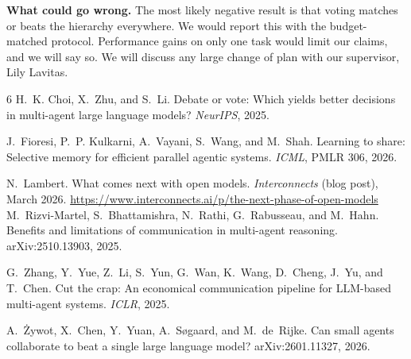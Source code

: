 \documentclass{article}
\begin{document}
\textbf{What could go wrong.} The most likely negative result is that voting matches or beats the hierarchy everywhere. We would report this with the budget-matched protocol. Performance gains on only one task would limit our claims, and we will say so. We will discuss any large change of plan with our supervisor, Lily Lavitas.
\newpage
\small
\begin{thebibliography}{6}\setlength{\itemsep}{0pt}\setlength{\parskip}{0pt}
H.~K. Choi, X.~Zhu, and S.~Li.
Debate or vote: Which yields better decisions in multi-agent large language models?
\emph{NeurIPS}, 2025.

J.~Fioresi, P.~P. Kulkarni, A.~Vayani, S.~Wang, and M.~Shah.
Learning to share: Selective memory for efficient parallel agentic systems.
\emph{ICML}, PMLR 306, 2026.

N.~Lambert.
What comes next with open models.
\emph{Interconnects} (blog post), March 2026. \url{https://www.interconnects.ai/p/the-next-phase-of-open-models}
M.~Rizvi-Martel, S.~Bhattamishra, N.~Rathi, G.~Rabusseau, and M.~Hahn.
Benefits and limitations of communication in multi-agent reasoning.
arXiv:2510.13903, 2025.

G.~Zhang, Y.~Yue, Z.~Li, S.~Yun, G.~Wan, K.~Wang, D.~Cheng, J.~Yu, and T.~Chen.
Cut the crap: An economical communication pipeline for LLM-based multi-agent systems.
\emph{ICLR}, 2025.

A.~\.{Z}ywot, X.~Chen, Y.~Yuan, A.~S{\o}gaard, and M.~de~Rijke.
Can small agents collaborate to beat a single large language model?
arXiv:2601.11327, 2026.
\end{thebibliography}
\end{document}
